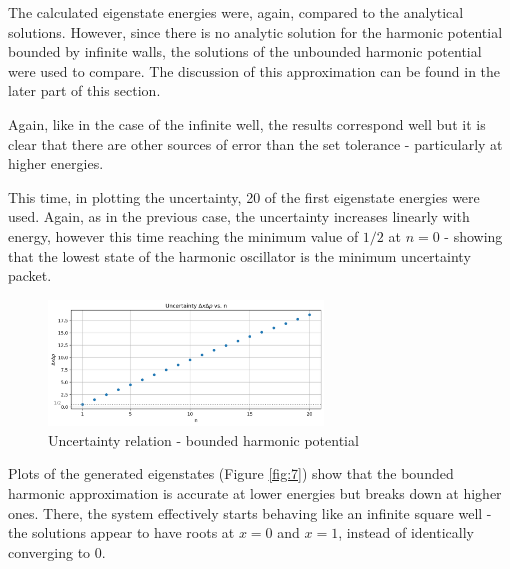 \documentclass[11pt]{article}
\begin{document}
The calculated eigenstate energies were, again, compared to the analytical solutions.
However, since there is no analytic solution for the harmonic potential bounded by
infinite walls, the solutions of the unbounded harmonic potential were used to compare.
The discussion of this approximation can be found in the later part of this section.

Again, like in the case of the infinite well, the results correspond well
but it is clear that there are other
sources of error than the set tolerance - particularly at higher energies.

This time, in plotting the uncertainty,
20 of the first eigenstate energies were used. Again, as in the 
previous case, the uncertainty increases linearly with energy,
however this time reaching the minimum value of $1/2$ at $n=0$ - showing
that the lowest state of the harmonic oscillator is the minimum uncertainty
packet.

\begin{figure}[!h]
    \centering
    \includegraphics[width=0.65\textwidth]{uncertainty2.png}
    \caption{Uncertainty relation - bounded harmonic potential}
\end{figure}

Plots of the generated eigenstates (Figure \ref{fig:7}) show that the bounded
harmonic approximation is accurate at lower energies but breaks down
at higher ones.
There, the system effectively starts behaving like an infinite
square well - 
the solutions appear to have roots at $x=0$ and $x=1$, instead of identically 
converging to 0.
\end{document}
